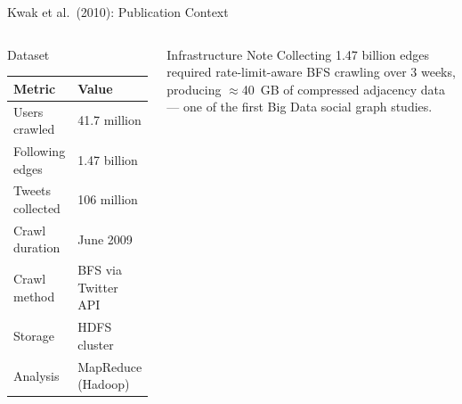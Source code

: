 \documentclass[aspectratio=169,10pt]{beamer}
\begin{document}
\begin{frame}{Kwak et al.\ (2010): Publication Context}
\begin{columns}[T]
      \begin{block}{Dataset}
        \renewcommand{\arraystretch}{1.25}
        \begin{tabular}{@{}ll@{}}
          \toprule
          \textbf{Metric} & \textbf{Value} \\
          \midrule
          Users crawled          & 41.7 million \\
          Following edges        & 1.47 billion \\
          Tweets collected       & 106 million \\
          Crawl duration         & June 2009 \\
          Crawl method           & BFS via Twitter API \\
          Storage                & HDFS cluster \\
          Analysis               & MapReduce (Hadoop) \\
          \bottomrule
        \end{tabular}
      \end{block}
      \vspace{5pt}
      \begin{alertblock}{Infrastructure Note}
        Collecting 1.47 billion edges required rate-limit-aware
        BFS crawling over 3 weeks, producing $\approx$40~GB
        of compressed adjacency data — one of the first
        Big Data social graph studies.
      \end{alertblock}
  \end{columns}
\end{frame}
\end{document}
